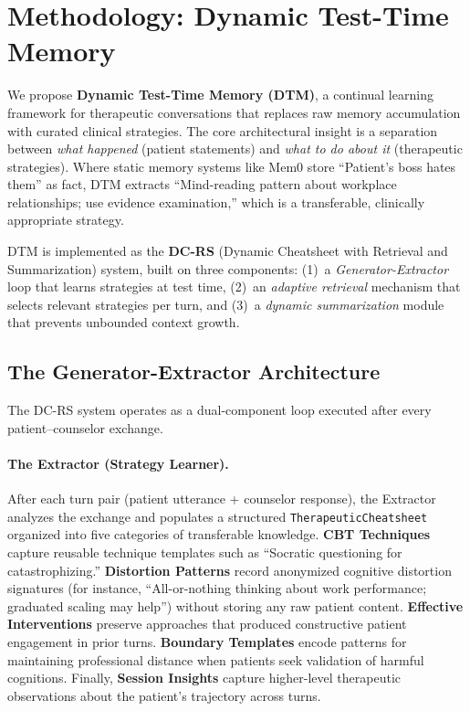 \section{Methodology: Dynamic Test-Time Memory}

We propose \textbf{Dynamic Test-Time Memory (DTM)}, a continual learning framework for therapeutic conversations that replaces raw memory accumulation with curated clinical strategies. The core architectural insight is a separation between \emph{what happened} (patient statements) and \emph{what to do about it} (therapeutic strategies). Where static memory systems like Mem0 store ``Patient's boss hates them'' as fact, DTM extracts ``Mind-reading pattern about workplace relationships; use evidence examination,'' which is a transferable, clinically appropriate strategy.

DTM is implemented as the \textbf{DC-RS} (Dynamic Cheatsheet with Retrieval and Summarization) system, built on three components: (1)~a \emph{Generator-Extractor} loop that learns strategies at test time, (2)~an \emph{adaptive retrieval} mechanism that selects relevant strategies per turn, and (3)~a \emph{dynamic summarization} module that prevents unbounded context growth.

\subsection{The Generator-Extractor Architecture}

The DC-RS system operates as a dual-component loop executed after every patient--counselor exchange.

\paragraph{The Extractor (Strategy Learner).}
After each turn pair (patient utterance + counselor response), the Extractor analyzes the exchange and populates a structured \texttt{TherapeuticCheatsheet} organized into five categories of transferable knowledge. \textbf{CBT Techniques} capture reusable technique templates such as ``Socratic questioning for catastrophizing.'' \textbf{Distortion Patterns} record anonymized cognitive distortion signatures (for instance, ``All-or-nothing thinking about work performance; graduated scaling may help'') without storing any raw patient content. \textbf{Effective Interventions} preserve approaches that produced constructive patient engagement in prior turns. \textbf{Boundary Templates} encode patterns for maintaining professional distance when patients seek validation of harmful cognitions. Finally, \textbf{Session Insights} capture higher-level therapeutic observations about the patient's trajectory across turns.

